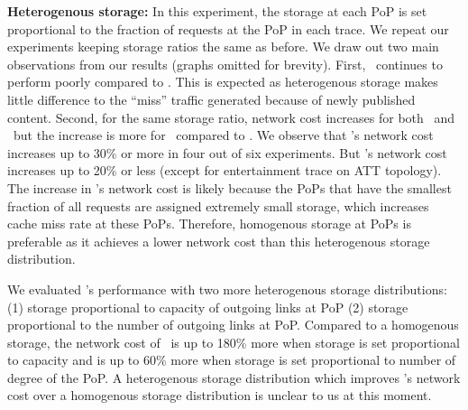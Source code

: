 \textbf{Heterogenous storage:}  In this experiment, the storage at each PoP is set proportional to the fraction of requests at the PoP in each trace. We repeat our experiments keeping storage ratios the same as before. %
We draw out two main observations from our results (graphs omitted for brevity). First, \optrp\ continues to perform poorly compared to \invlru. This is expected as heterogenous storage makes little difference to the ``miss'' traffic generated because of newly published content. Second, for the same storage ratio, network cost increases for both  \invlru\ and  \optrpfuture\ but the increase is more for \invlru\ compared to \optrpfuture. We observe that \invlru's network cost increases up to 30\% or more in four out of six experiments. But \optrpfuture's network cost increases up to 20\% or less (except for entertainment trace on ATT topology).  The increase in \invlru's network cost is likely because the PoPs that have the smallest fraction of all requests are assigned extremely small storage, which increases cache miss rate at these PoPs. Therefore, homogenous storage at PoPs is preferable as it achieves a lower network cost than this heterogenous storage distribution.


We evaluated \invlru's performance with two more heterogenous storage distributions: (1) storage proportional to capacity of outgoing links at PoP (2) storage proportional to the number of outgoing links at PoP. Compared to a homogenous storage, the network cost of \invlru\ is up to 180\% more when storage is set proportional to capacity and is up to 60\% more when storage is set proportional to number of degree of the PoP. A heterogenous storage distribution which improves \invlru's network cost over a homogenous storage distribution  is unclear to us at this moment.






